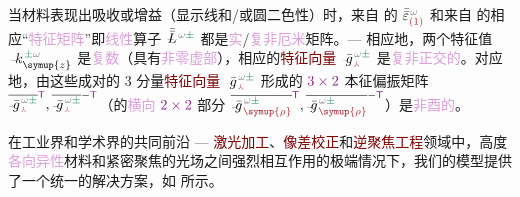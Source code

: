 当材料表现出\textcolor{NavyBlue}{吸收}或\textcolor{NavyBlue}{增益}（显示\textcolor{NavyBlue}{线}和/或\textcolor{NavyBlue}{圆二色性}）时，来自  的 $\bar{\bar{\varepsilon}}^{\;\! \mathcolor{gray}{\omega}}_{\textcolor{Maroon}{(1)}}$ 和来自  的相应“\textcolor{Plum}{特征矩阵}”即\textcolor{Plum}{线性}算子 $\Xint{\mathcolor{gray}{-}}{30}{\bar{\bar{L}}}^{\;\! \mathcolor{gray}{\omega} \textcolor{PineGreen}{\pm}}$ 都是\textcolor{Plum}{实}/\textcolor{Plum}{复非厄米}矩阵。--- 相应地，两个\textcolor{PineGreen}{特征值} $\Xint{\begin{smallmatrix} ~ \\ {}^{}_{\mathcolor{gray}{-}} \\ ~ \end{smallmatrix}}{15}{k}_{\symup{z} }^{\;\! \textcolor{PineGreen}{\pm} \mathcolor{gray}{\omega}}$ 是\textcolor{Plum}{复数}（具有\textcolor{Plum}{非零虚部}），相应的\textcolor{Maroon}{特征向量} $\Xint{{}^{}_{\mathcolor{gray}{-}}}{10}{\bar{g}}^{\;\!\mathcolor{gray}{\omega} \textcolor{PineGreen}{\pm}}_{\;\! \textcolor{Maroon}{\Yup}}$ 是\textcolor{Plum}{复非正交的}。对应地，由这些成对的 3 分量\textcolor{Maroon}{特征向量} $\Xint{{}^{}_{\mathcolor{gray}{-}}}{10}{\bar{g}}^{\;\!\mathcolor{gray}{\omega} \textcolor{PineGreen}{\pm}}_{\;\! \textcolor{Maroon}{\Yup}}$ 形成的 $\textcolor{Plum}{3 \times 2}$ \textcolor{PineGreen}{本征偏振矩阵} $\overline{\Xint{{}^{}_{\mathcolor{gray}{-}}}{10}{\bar{g}}^{\;\!\mathcolor{gray}{\omega} \textcolor{PineGreen}{\pm}}_{\;\! \textcolor{Maroon}{\Yup}}}^{\mathsf{\textcolor{Plum}{T}}}, \overline{\Xint{{}^{}_{\mathcolor{gray}{-}}}{10}{\bar{g}}^{\;\!\mathcolor{gray}{\omega} \textcolor{PineGreen}{\pm}}_{\;\! \textcolor{Maroon}{\Yup}}}^{-\mathsf{\textcolor{Plum}{T}}}$（的\textcolor{Plum}{横向} $\textcolor{Plum}{2 \times 2}$ 部分 $\overline{\Xint{{}^{}_{\mathcolor{gray}{-}}}{10}{\bar{g}}^{\;\!\mathcolor{gray}{\omega} \textcolor{PineGreen}{\pm}}_{\;\! \textcolor{Maroon}{\symup{\rho}}}}^{\mathsf{\textcolor{Plum}{T}}}, \overline{\Xint{{}^{}_{\mathcolor{gray}{-}}}{10}{\bar{g}}^{\;\!\mathcolor{gray}{\omega} \textcolor{PineGreen}{\pm}}_{\;\! \textcolor{Maroon}{\symup{\rho}}}}^{-\mathsf{\textcolor{Plum}{T}}}$）是\textcolor{Plum}{非酉的}。

在工业界和学术界的共同前沿 --- \textcolor{Maroon}{激光加工}、\textcolor{Maroon}{像差校正}和\textcolor{Maroon}{逆聚焦工程}领域中，高度\textcolor{Plum}{各向异性}材料和\textcolor{PineGreen}{紧密聚焦}的光场之间强烈相互作用的极端情况下，我们的模型提供了一个统一的解决方案，如  所示。


